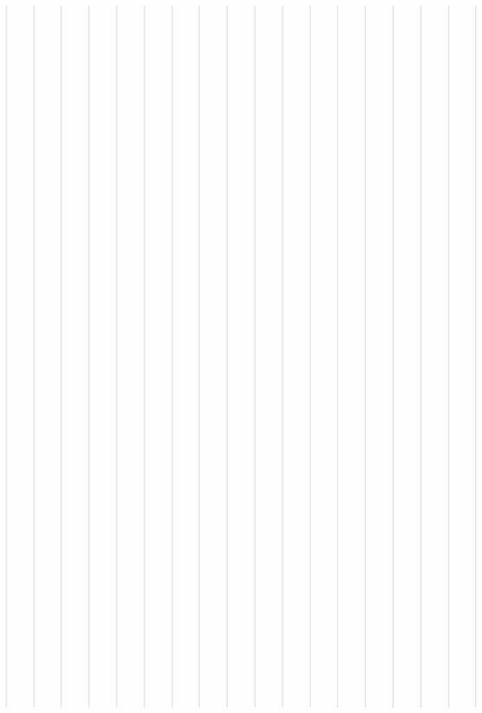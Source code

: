 \documentclass[letterpaper,10pt,english]{sphinxmanual}
\begin{document}
\begin{quote}
\begin{quote}
\begin{quote}
\begin{quote}
\begin{quote}
\begin{quote}
\begin{quote}
\begin{quote}
\begin{quote}
\begin{quote}
\begin{quote}
\begin{quote}
\begin{quote}
\begin{quote}
\begin{quote}
\begin{quote}
\begin{quote}
\begin{quote}
\begin{quote}
\begin{quote}
\begin{quote}
\begin{quote}
\begin{quote}
\begin{quote}
\begin{quote}
\begin{quote}
\begin{quote}
\begin{quote}
\begin{quote}
\begin{quote}
\begin{quote}
\begin{quote}
\begin{quote}
\begin{quote}
\begin{quote}
\begin{quote}
\begin{quote}
\begin{quote}
\begin{quote}
\begin{quote}
\begin{quote}
\begin{quote}
\begin{quote}
\begin{quote}
\begin{quote}
\begin{quote}
\begin{quote}
\begin{quote}
\begin{quote}
\begin{quote}
\begin{quote}
\begin{quote}
\begin{quote}
\begin{quote}
\begin{quote}
\begin{quote}
\begin{quote}
\begin{quote}
\begin{quote}
\begin{quote}
\begin{quote}
\begin{quote}
\begin{quote}
\begin{quote}
\begin{quote}
\begin{quote}
\begin{quote}
\begin{quote}
\begin{quote}
\begin{quote}
\begin{quote}
\begin{quote}
\begin{quote}
\begin{quote}
\begin{quote}
\begin{quote}
\begin{quote}
\begin{quote}
\begin{quote}
\begin{quote}
\begin{quote}
\begin{quote}
\begin{quote}
\begin{quote}
\begin{quote}
\begin{quote}
\begin{quote}
\begin{quote}
\begin{quote}
\begin{quote}
\begin{quote}
\begin{quote}
\begin{quote}
\begin{sphinxShadowBox}
\begin{itemize}

\sphinxAtStartPar
{}\label{\detokenize{schema_tables:id270}}{\hyperref[\detokenize{schema_tables:province-table}]{}}
>>>>>>> gh-pages

\end{itemize}
\end{sphinxShadowBox}


\subsection{Overview Table}
<<<<<<< HEAD
\label{\detokenize{database_schema:overview-table}}

\begin{savenotes}\sphinxatlongtablestart\begin{longtable}[c]{|||}
\sphinxthelongtablecaptionisattop

\end{longtable}
\end{savenotes}
\end{quote}
\end{quote}
\end{quote}
\end{quote}
\end{quote}
\end{quote}
\end{quote}
\end{quote}
\end{quote}
\end{quote}
\end{quote}
\end{quote}
\end{quote}
\end{quote}
\end{quote}
\end{quote}
\end{quote}
\end{quote}
\end{quote}
\end{quote}
\end{quote}
\end{quote}
\end{quote}
\end{quote}
\end{quote}
\end{quote}
\end{quote}
\end{quote}
\end{quote}
\end{quote}
\end{quote}
\end{quote}
\end{quote}
\end{quote}
\end{quote}
\end{quote}
\end{quote}
\end{quote}
\end{quote}
\end{quote}
\end{quote}
\end{quote}
\end{quote}
\end{quote}
\end{quote}
\end{quote}
\end{quote}
\end{quote}
\end{quote}
\end{quote}
\end{quote}
\end{quote}
\end{quote}
\end{quote}
\end{quote}
\end{quote}
\end{quote}
\end{quote}
\end{quote}
\end{quote}
\end{quote}
\end{quote}
\end{quote}
\end{quote}
\end{quote}
\end{quote}
\end{quote}
\end{quote}
\end{quote}
\end{quote}
\end{quote}
\end{quote}
\end{quote}
\end{quote}
\end{quote}
\end{quote}
\end{quote}
\end{quote}
\end{quote}
\end{quote}
\end{quote}
\end{quote}
\end{quote}
\end{quote}
\end{quote}
\end{quote}
\end{quote}
\end{quote}
\end{quote}
\end{quote}
\end{quote}
\end{quote}
\end{quote}
\end{document}
